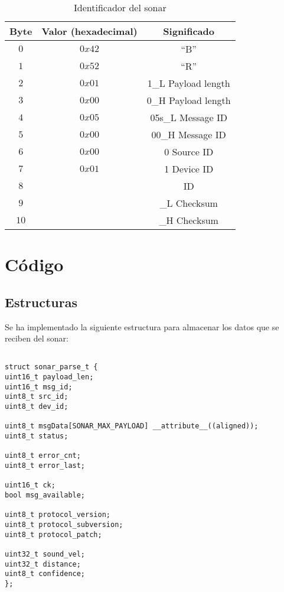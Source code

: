 \begin{table}[h]
	\centering
	\caption{Identificador del sonar}
	\begin{tabular}{|c|c|c|}
		\hline
		\textbf{Byte}	&\textbf{Valor (hexadecimal)} &\textbf{Significado} \\ \hline  \hline
		$0$		&$0x42$		& ``B'' \\ \hline
		$1$		&$0x52$		& ``R'' \\ \hline
		$2$		&$0x01$		& 1\_L Payload length \\ \hline
		$3$		&$0x00$		& 0\_H Payload length \\ \hline
		$4$		&$0x05$		& 05s\_L Message ID \\ \hline
		$5$		&$0x00$		& 00\_H Message ID \\ \hline
		$6$		&$0x00$		& 0    Source ID \\ \hline 
		$7$		&$0x01$		& 1    Device ID \\ \hline
		$8$		&			& ID \\ \hline
		$9$		&			& \_L Checksum\\ \hline   
		$10$	&			& \_H Checksum\\ \hline  
	\end{tabular}
	\label{tab:11}
\end{table}


\section{Código}\label{sec:3}

\subsection{Estructuras}

Se ha implementado la siguiente estructura para almacenar los datos que se reciben del sonar:
\begin{lstlisting}[style=C]

struct sonar_parse_t {
uint16_t payload_len;
uint16_t msg_id;
uint8_t src_id;
uint8_t dev_id;

uint8_t msgData[SONAR_MAX_PAYLOAD] __attribute__((aligned));
uint8_t status;

uint8_t error_cnt;
uint8_t error_last;

uint16_t ck;
bool msg_available;

uint8_t protocol_version;
uint8_t protocol_subversion;
uint8_t protocol_patch;

uint32_t sound_vel;
uint32_t distance;
uint8_t confidence;
};
\end{lstlisting}


